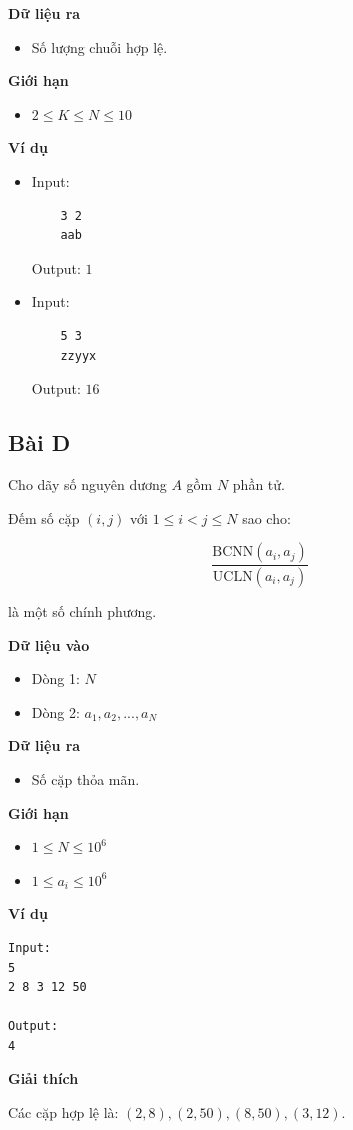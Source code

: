 \textbf{Dữ liệu ra}
\begin{itemize}
    \item Số lượng chuỗi hợp lệ.
\end{itemize}

\textbf{Giới hạn}
\begin{itemize}
    \item $2 \le K \le N \le 10$
\end{itemize}

\textbf{Ví dụ}
\begin{itemize}
    \item Input: 
    \begin{verbatim}
    3 2
    aab
    \end{verbatim}
    Output: $1$

    \item Input:
    \begin{verbatim}
    5 3
    zzyyx
    \end{verbatim}
    Output: $16$
\end{itemize}

\vspace{0.5cm}

\subsection*{Bài D}

Cho dãy số nguyên dương $A$ gồm $N$ phần tử.

Đếm số cặp $(i, j)$ với $1 \le i < j \le N$ sao cho:

$$
\frac{\mathrm{BCNN}(a_i, a_j)}{\mathrm{UCLN}(a_i, a_j)}
$$

là một số chính phương.

\textbf{Dữ liệu vào}
\begin{itemize}
    \item Dòng 1: $N$
    \item Dòng 2: $a_1, a_2, ..., a_N$
\end{itemize}

\textbf{Dữ liệu ra}
\begin{itemize}
    \item Số cặp thỏa mãn.
\end{itemize}

\textbf{Giới hạn}
\begin{itemize}
    \item $1 \le N \le 10^6$
    \item $1 \le a_i \le 10^6$
\end{itemize}

\textbf{Ví dụ}
\begin{verbatim}
Input:
5
2 8 3 12 50

Output:
4
\end{verbatim}

\textbf{Giải thích}

Các cặp hợp lệ là: $(2,8), (2,50), (8,50), (3,12)$.
